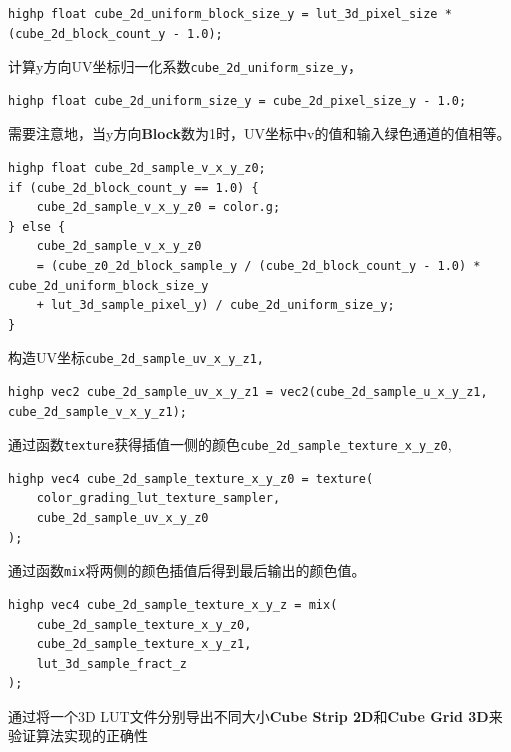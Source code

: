\documentclass{ctexart}
\begin{document}
    \begin{verbatim}
highp float cube_2d_uniform_block_size_y = lut_3d_pixel_size * (cube_2d_block_count_y - 1.0);
    \end{verbatim}
    计算y方向UV坐标归一化系数\verb|cube_2d_uniform_size_y|，
    \begin{verbatim}
highp float cube_2d_uniform_size_y = cube_2d_pixel_size_y - 1.0;
    \end{verbatim}
    需要注意地，当y方向\textbf{Block}数为1时，UV坐标中v的值和输入绿色通道的值相等。
    \begin{verbatim}
highp float cube_2d_sample_v_x_y_z0;
if (cube_2d_block_count_y == 1.0) {
    cube_2d_sample_v_x_y_z0 = color.g;
} else {
    cube_2d_sample_v_x_y_z0 
    = (cube_z0_2d_block_sample_y / (cube_2d_block_count_y - 1.0) * cube_2d_uniform_block_size_y 
    + lut_3d_sample_pixel_y) / cube_2d_uniform_size_y;
}
    \end{verbatim}
    构造UV坐标\verb|cube_2d_sample_uv_x_y_z1,|
\begin{verbatim}
highp vec2 cube_2d_sample_uv_x_y_z1 = vec2(cube_2d_sample_u_x_y_z1, cube_2d_sample_v_x_y_z1);
\end{verbatim}    
    通过函数\verb|texture|获得插值一侧的颜色\verb|cube_2d_sample_texture_x_y_z0|,
\begin{verbatim}
highp vec4 cube_2d_sample_texture_x_y_z0 = texture(
    color_grading_lut_texture_sampler,
    cube_2d_sample_uv_x_y_z0
);
\end{verbatim}     
    通过函数\verb|mix|将两侧的颜色插值后得到最后输出的颜色值。
\begin{verbatim}
highp vec4 cube_2d_sample_texture_x_y_z = mix(
    cube_2d_sample_texture_x_y_z0, 
    cube_2d_sample_texture_x_y_z1, 
    lut_3d_sample_fract_z
);
\end{verbatim}
    通过将一个3D LUT文件分别导出不同大小\textbf{Cube Strip 2D}和\textbf{Cube Grid 3D}来验证算法实现的正确性
\end{document}
